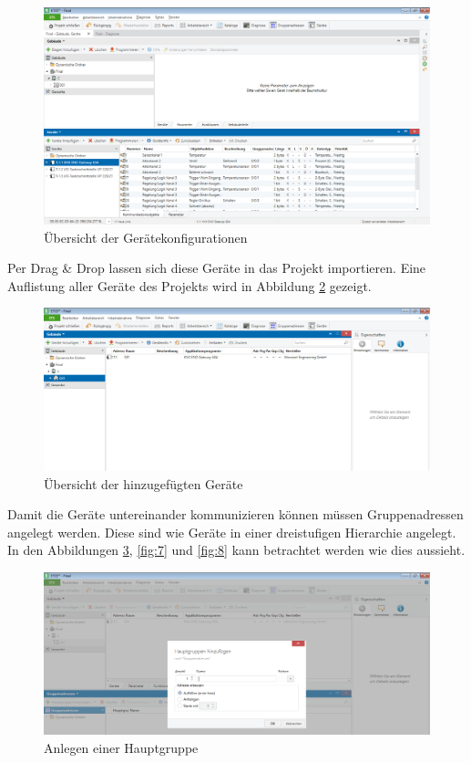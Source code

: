 \documentclass[a4paper]{article}
\begin{document}
\begin{figure}[H]
	\centering
	\includegraphics[width=13cm]{Doku/4}
	\caption{Übersicht der Gerätekonfigurationen}
	\label{fig:4}
\end{figure}

Per Drag \& Drop lassen sich diese Geräte in das Projekt importieren. Eine Auflistung aller Geräte des Projekts wird in Abbildung \ref{fig:5} gezeigt.

\begin{figure}[H]
	\centering
	\includegraphics[width=13cm]{Doku/5}
	\caption{Übersicht der hinzugefügten Geräte}
	\label{fig:5}
\end{figure}

Damit die Geräte untereinander kommunizieren können müssen Gruppenadressen angelegt werden. Diese sind wie Geräte in einer dreistufigen Hierarchie angelegt. In den Abbildungen \ref{fig:6}, \ref{fig:7} und \ref{fig:8} kann betrachtet werden wie dies aussieht.

\begin{figure}[H]
	\centering
	\includegraphics[width=13cm]{Doku/6n}
	\caption{Anlegen einer Hauptgruppe}
	\label{fig:6}
\end{figure}
\end{document}
